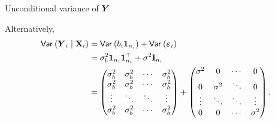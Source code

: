 \documentclass{beamer}
\begin{document}
\begin{frame}{Unconditional variance of $\boldsymbol {Y}$}


Alternatively,
\begin{align*}
   {\mathsf{Var}_{}}\left(\boldsymbol {Y}_i \mid \mathbf{X}_i\right) &= {\mathsf{Var}_{}}\left(b_i \boldsymbol {1}_{n_i}\right) + {\mathsf{Var}_{}}\left(\boldsymbol {\varepsilon}_i\right)
   \\&= \sigma^2_b \boldsymbol {1}_{n_i}\boldsymbol {1}_{n_i}^\top + \sigma^2 \mathbf{I}_{n_i}
   \\&= 
   \begin{pmatrix}
 \sigma^2_b &  \sigma^2_b & \cdots & \sigma^2_b \\
  \sigma^2_b &  \sigma^2_b & \cdots & \sigma^2_b \\
 \vdots & \ddots & \ddots & \vdots \\
 \sigma^2_b &  \sigma^2_b & \cdots & \sigma^2_b   
 \end{pmatrix} + \begin{pmatrix}
 \sigma^2 & 0 & \cdots &0\\
 0 & \sigma^2 & \ddots &0\\
 \vdots &\ddots & \ddots & \vdots\\
 0 & 0 & \cdots & \sigma^2
 \end{pmatrix}.
\end{align*}

\end{frame}
\end{document}
